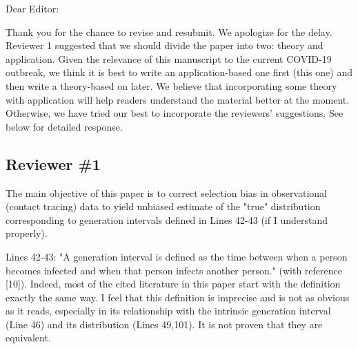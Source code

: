 \usepackage[utf8]{inputenc}

\usepackage{color}

\usepackage{natbib}


\usepackage{lmodern}
\usepackage{amssymb,amsmath}

\newcommand{\rR}{\mbox{$r$--$\cal R$}}
\newcommand{\RR}{\ensuremath{{\cal R}}}
\newcommand{\RRhat}{\ensuremath{{\hat \cal R}}}
\newcommand{\Rx}[1]{\ensuremath{{\cal R}_{#1}}} 
\newcommand{\Ro}{\Rx{0}}
\newcommand{\Reff}{\Rx{\mathit{eff}}}
\newcommand{\Tc}{\ensuremath{C}}

\newcommand{\Rini}{\Rx{\textrm{\tiny initial}}}

\newcommand{\rev}{\subsection*}
\newcommand{\revtext}{\textsf}
\setlength{\parskip}{\baselineskip}
\setlength{\parindent}{0em}

\newcommand{\comment}[3]{\textcolor{#1}{\textbf{[#2: }\textsl{#3}\textbf{]}}}
\newcommand{\jd}[1]{\comment{cyan}{JD}{#1}}
\newcommand{\swp}[1]{\comment{magenta}{SWP}{#1}}
\newcommand{\dc}[1]{\comment{blue}{DC}{#1}}
\newcommand{\jsw}[1]{\comment{green}{JSW}{#1}}
\newcommand{\hotcomment}[1]{\comment{red}{HOT}{#1}}



\noindent Dear Editor:

Thank you for the chance to revise and resubmit.
We apologize for the delay.
Reviewer 1 suggested that we should divide the paper into two: theory and application.
Given the relevance of this manuscript to the current COVID-19 outbreak, we think it is best to write an application-based one first (this one) and then write a theory-based on later.
We believe that incorporating some theory with application will help readers understand the material better at the moment.
Otherwise, we have tried our best to incorporate the reviewers' suggestions.
See below for detailed response.

\rev{Reviewer \#1}

\revtext{The main objective of this paper is to correct selection bias in observational
(contact tracing) data to yield unbiased estimate of the "true" distribution
corresponding to generation intervals defined in Lines 42-43 (if I understand
properly).}

\revtext{Lines 42-43: "A generation interval is defined as the time between when a
person becomes infected and when that person infects another person."
(with reference [10]). Indeed, most of the cited literature in this paper
start with the definition exactly the same way. I feel that this definition
is imprecise and is not as obvious as it reads, especially in its relationship
with the intrinsic generation interval (Line 46) and its distribution (Lines
49,101). It is not proven that they are equivalent.}

